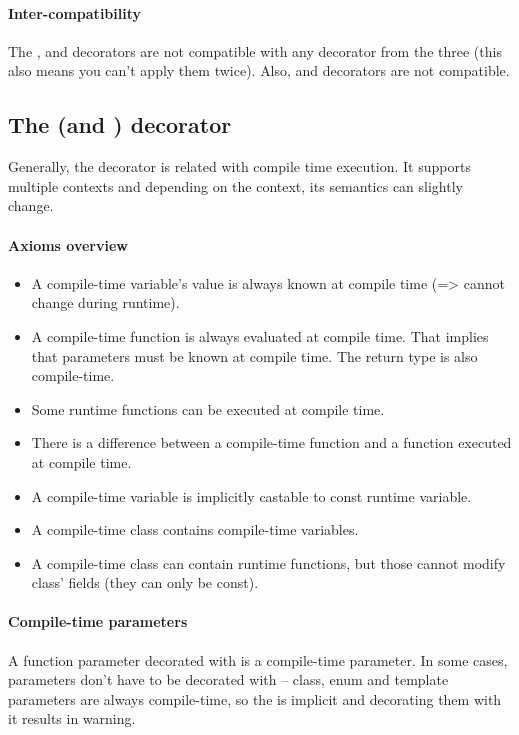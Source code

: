 \paragraph{Inter-compatibility}
The ,  and  decorators are not compatible with any decorator from the three (this also means you can't apply them twice). Also,  and  decorators are not compatible.

\subsection{The  (and ) decorator} \label{decorator:ctime}
Generally, the  decorator is related with compile time execution. It supports multiple contexts and depending on the context, its semantics can slightly change.

\paragraph{Axioms overview}
\begin{itemize}
	\item A compile-time variable's value is always known at compile time (=> cannot change during runtime).
	\item A compile-time function is always evaluated at compile time. That implies that parameters must be known at compile time. The return type is also compile-time.
	\item Some runtime functions can be executed at compile time.
	\item There is a difference between a compile-time function and a function executed at compile time.
	\item A compile-time variable is implicitly castable to const runtime variable.
	\item A compile-time class contains compile-time variables.
	\item A compile-time class can contain runtime functions, but those cannot modify class' fields (they can only be const).
\end{itemize}

\paragraph{Compile-time parameters}
A function parameter decorated with  is a compile-time parameter. In some cases, parameters don't have to be decorated with  -- class, enum and template parameters are always compile-time, so the  is implicit and decorating them with it results in warning.

